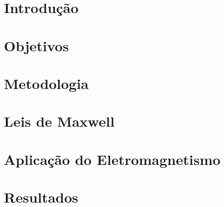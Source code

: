 \documentclass[a4paper, 12pt]{article}
\begin{document}
\newpage

\listoffigures
\thispagestyle{empty}
\newpage

\listoftables
\thispagestyle{empty}
\newpage

\tableofcontents
\thispagestyle{empty}

\setcounter{page}{0}
\newpage

\section{Introdução}


\section{Objetivos}


\section{Metodologia}


\section{Leis de Maxwell}


\section{Aplicação do Eletromagnetismo}


\section{Resultados}


\nocite{moyses}
\nocite{jackson1999classical}
\nocite{shannon}
\nocite{zero20}
\nocite{sakurai2021modern}

\newpage
{}


\end{document}
